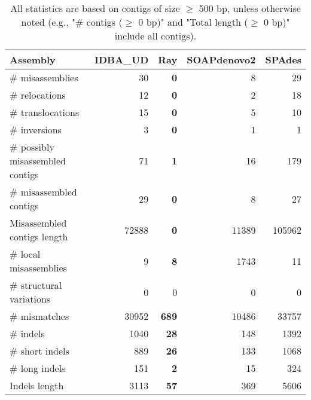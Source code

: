 \documentclass[12pt,a4paper]{article}
\begin{document}
\begin{table}[ht]
\begin{center}
\caption{All statistics are based on contigs of size $\geq$ 500 bp, unless otherwise noted (e.g., "\# contigs ($\geq$ 0 bp)" and "Total length ($\geq$ 0 bp)" include all contigs).}
\begin{tabular}{|l*{4}{|r}|}
\hline
Assembly & IDBA\_UD & Ray & SOAPdenovo2 & SPAdes \\ \hline
\# misassemblies & 30 & {\bf 0} & 8 & 29 \\ \hline
\hspace{5mm}\# relocations & 12 & {\bf 0} & 2 & 18 \\ \hline
\hspace{5mm}\# translocations & 15 & {\bf 0} & 5 & 10 \\ \hline
\hspace{5mm}\# inversions & 3 & {\bf 0} & 1 & 1 \\ \hline
\# possibly misassembled contigs & 71 & {\bf 1} & 16 & 179 \\ \hline
\# misassembled contigs & 29 & {\bf 0} & 8 & 27 \\ \hline
Misassembled contigs length & 72888 & {\bf 0} & 11389 & 105962 \\ \hline
\# local misassemblies & 9 & {\bf 8} & 1743 & 11 \\ \hline
\# structural variations & 0 & 0 & 0 & 0 \\ \hline
\# mismatches & 30952 & {\bf 689} & 10486 & 33757 \\ \hline
\# indels & 1040 & {\bf 28} & 148 & 1392 \\ \hline
\hspace{5mm}\# short indels & 889 & {\bf 26} & 133 & 1068 \\ \hline
\hspace{5mm}\# long indels & 151 & {\bf 2} & 15 & 324 \\ \hline
Indels length & 3113 & {\bf 57} & 369 & 5606 \\ \hline
\end{tabular}
\end{center}
\end{table}
\end{document}

